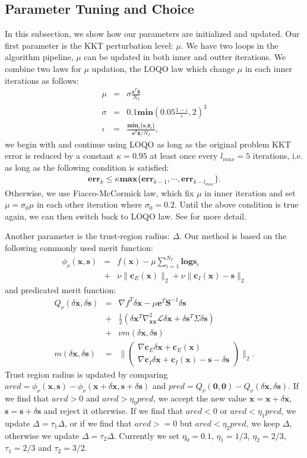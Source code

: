 \documentclass[annual]{acmsiggraph}
\newcommand{\E}[1]{\mathbf{#1}}
\newcommand{\TWOC}[2]{\left(\begin{array}{c}#1 \\ #2\end{array}\right)}
\begin{document}
\subsection{Parameter Tuning and Choice}
In this subsection, we show how our parameters are initialized and updated. Our first parameter is the KKT perturbation level: $\mu$. We have two loops in the algorithm pipeline, $\mu$ can be updated in both inner and outter iterations. We combine two laws for $\mu$ updation, the LOQO law which change $\mu$ in each inner iterations as follows:
\begin{eqnarray*}
\mu&=&\sigma\frac{\E{s}^T\E{z}}{N_I}	\\
\sigma&=&0.1\E{min}(0.05\frac{1-\iota}{\iota},2)^3	\\
\iota&=&\frac{\E{min}_i\{\E{s}_i\E{z}_i\}}{\E{s}^T\E{z}/N_I},
\end{eqnarray*}
we begin with and continue using LOQO as long as the original problem KKT error is reduced by a constant $\kappa=0.95$ at least once every $l_{max}=5$ iterations, i.e. as long as the following condition is satisfied:
\begin{eqnarray*}
\E{err}_k \leq \kappa \E{max}\{\E{err}_{k-1},\cdots,\E{err}_{k-l_{max}}\}.
\end{eqnarray*}
Otherwise, we use Fiacco-McCormick law, which fix $\mu$ in inner iteration and set $\mu=\sigma_0\mu$ in each other iteration where $\sigma_0=0.2$. Until the above condition is true again, we can then switch back to LOQO law. See \cite{nocedal2009adaptive} for more detail.

Another parameter is the trust-region radius: $\Delta$. Our method is based on the following commonly used merit function:
\begin{eqnarray*}
\phi_\nu(\E{x},\E{s})&=&f(\E{x})-\mu\sum_{i=1}^{N_I}\E{log}\E{s}_i	\\
&+&\nu\|\E{c}_E(\E{x})\|_2+\nu\|\E{c}_I(\E{x})-\E{s}\|_2
\end{eqnarray*}
and predicated merit function:
\begin{eqnarray*}
Q_\nu(\delta\E{x},\delta\E{s})&=&\nabla f^T\delta\E{x}-\mu\E{e}^T\E{S}^{-1}\delta\E{s}	\\
&+&\frac{1}{2}(\delta\E{x}^T\nabla^2_{\E{x}\E{x}}\mathcal{L}\delta\E{x}+\delta\E{s}^T\Sigma\delta\E{s})	\\
&+&\nu m(\delta\E{x},\delta\E{s})	\\
m(\delta\E{x},\delta\E{s})&=&\|\TWOC{\nabla\E{c}_E\delta\E{x}+\E{c}_E(\E{x})}{\nabla\E{c}_I\delta\E{x}+\E{c}_I(\E{x})-\E{s}-\delta\E{s}}\|_2.
\end{eqnarray*}
Trust region radius is updated by comparing $ared=\phi_\nu(\E{x},\E{s})-\phi_\nu(\E{x}+\delta\E{x},\E{s}+\delta\E{s})$ and $pred=Q_\nu(\E{0},\E{0})-Q_\nu(\delta\E{x},\delta\E{s})$. If we find that $ared > 0$ and $ared > \eta_0 pred$, we accept the new value $\E{x}=\E{x}+\delta\E{x}$, $\E{s}=\E{s}+\delta\E{s}$ and reject it otherwise. If we find that $ared < 0$ or $ared < \eta_1 pred$, we update $\Delta=\tau_1\Delta$, or if we find that $ared >= 0$ but $ared < \eta_2 pred$, we keep $\Delta$, otherwise we update $\Delta=\tau_2\Delta$. Currently we set $\eta_0=0.1$, $\eta_1=1/3$, $\eta_2=2/3$, $\tau_1=2/3$ and $\tau_2=3/2$. 
\end{document}
